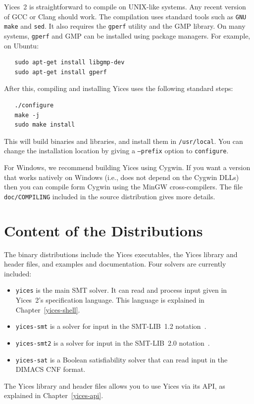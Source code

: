 \documentclass[11pt,twoside,fleqn,openright,titlepage]{cslreport}
\begin{document}
Yices~2 is straightforward to compile on UNIX-like systems. Any recent
version of GCC or Clang should work. The compilation uses standard
tools such as \texttt{GNU make} and \texttt{sed}. It also requires the
\texttt{gperf} utility and the GMP library. On many systems,
\texttt{gperf} and GMP can be installed using package
managers.  For example, on Ubuntu:
\begin{small}
\begin{verbatim}
   sudo apt-get install libgmp-dev
   sudo apt-get install gperf
\end{verbatim}
\end{small}
After this, compiling and installing Yices uses the following standard steps:
\begin{small}
\begin{verbatim}
   ./configure
   make -j
   sudo make install
\end{verbatim}
\end{small}
This will build binaries and libraries, and install them in \texttt{/usr/local}.
You can change the installation location by giving a \texttt{--prefix} option
to \texttt{configure}.

For Windows, we recommend building Yices using Cygwin. If you want a
version that works natively on Windows (i.e., does not depend on the
Cygwin DLLs) then you can compile form Cygwin using the MinGW
cross-compilers.  The file \texttt{doc/COMPILING} included in the
source distribution gives more details.



\section{Content of the Distributions}

The binary distributions include the Yices executables, the Yices
library and header files, and examples and documentation.  Four
solvers are currently included:
\begin{itemize}
\item \texttt{yices} is  the main SMT solver. It  can read and process
  input given  in Yices~2's  specification language. This  language is
  explained in Chapter~\ref{yices-shell}.

\item  \texttt{yices-smt} is  a solver  for input  in  the SMT-LIB~1.2
  notation~\cite{SMTLIB12:2006}.

\item \texttt{yices-smt2} is a solver for input in the SMT-LIB~2.0
  notation~\cite{SMTLIB20:2012}.

\item \texttt{yices-sat}  is a Boolean satisfiability  solver that can
  read input in the DIMACS CNF format.
\end{itemize}
The Yices library and header files allows you to use Yices via its
API, as explained in Chapter~\ref{yices-api}.
\end{document}
